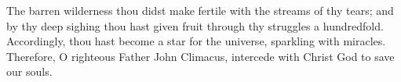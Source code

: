 \documentclass[twoside, letterpaper, 12pt]{report}
\begin{document}


The barren wilderness thou didst make fertile with the streams of thy tears; and by thy deep sighing
thou hast given fruit through thy struggles a hundredfold. Accordingly, thou hast become a star for
the universe, sparkling with miracles. Therefore, O righteous Father John Climacus, intercede with
Christ God to save our souls.

\readerline{\throughtheprayers}

\end{document}

